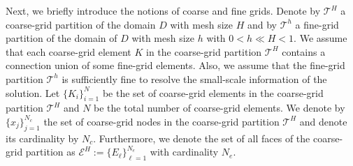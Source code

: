 \documentclass{article}[11pt]
\renewcommand{\div}{\mathop{\rm div}\nolimits}
\theoremstyle{definition}
\begin{document}

\noindent
Next, we briefly introduce the notions of coarse and fine grids.
Denote by $\mathcal{T}^H$ a coarse-grid partition of the domain $D$ with mesh size $H$ and by $\mathcal{T}^h$ a fine-grid partition of the domain of $D$ with mesh size $h$ with $0 < h \ll H < 1$. 
We assume that each coarse-grid element $K$ in the coarse-grid partition $\mathcal{T}^H$ contains a connection union of some fine-grid elements. Also, we assume that the fine-grid partition $\mathcal{T}^h$ is sufficiently fine to resolve the small-scale information of the solution.
Let $\{K_i \}_{i = 1}^N$ be the set of coarse-grid elements in the coarse-grid partition $\mathcal{T}^H$ and $N$ be the total number of coarse-grid elements. We denote by $\{ x_j \}_{j=1}^{N_c}$ the set of coarse-grid nodes in the coarse-grid partition $\mathcal{T}^H$ and denote its cardinality by $N_c$. Furthermore, we denote the set of all faces of the coarse-grid partition as $\mathcal{E}^H := \{ E_\ell \}_{\ell=1}^{N_e}$ with cardinality $N_e$.  
\end{document}

